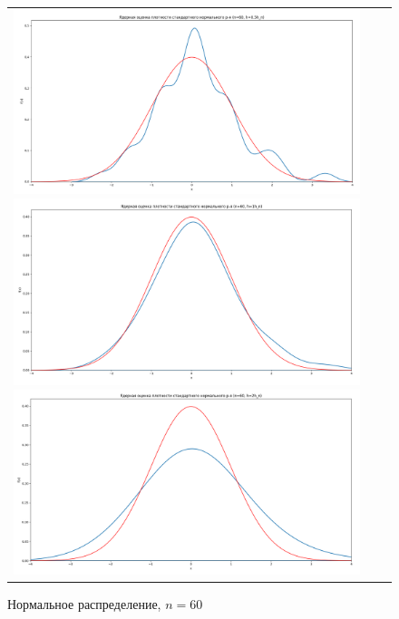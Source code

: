 \begin{figure}[H]
	\begin{tabular}{ccc}
		\includegraphics[scale=0.14]{resources/4_gauss_60_half.png}
		\includegraphics[scale=0.14]{resources/4_gauss_60_one.png}
		\includegraphics[scale=0.14]{resources/4_gauss_60_two.png}
	\end{tabular}
	\caption{Нормальное распределение, $n=60$}
\end{figure}

